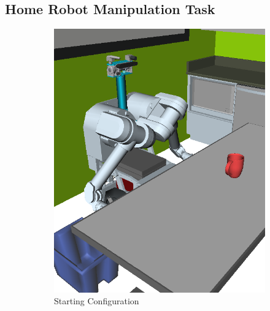 \subsection{Home Robot Manipulation Task}
\label{subsec:herb-experiment}

\begin{figure}
\begin{widepage}
\centering

\begin{subfigure}[t]{0.185\linewidth}
\centering
\includegraphics[width=\columnwidth]{figs/testherb-a.png}
\caption{Starting Configuration}
\end{subfigure}
\begin{subfigure}[t]{0.185\linewidth}
\centering

\end{subfigure}
\end{widepage}
\end{figure}
